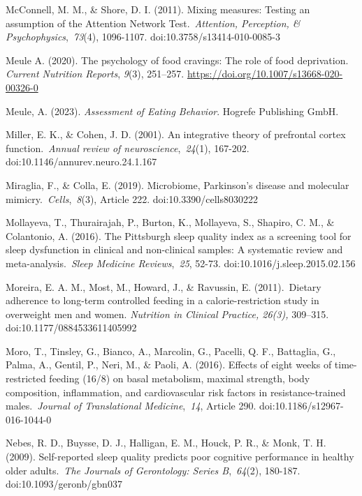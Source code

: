 \documentclass[authordate, empirical]{jote-new-article}
\begin{document}
McConnell, M. M., \& Shore, D. I. (2011). Mixing measures: Testing an assumption of the Attention Network Test. \emph{Attention, Perception, \& Psychophysics}, \emph{73}(4), 1096-1107. doi:10.3758/s13414-010-0085-3



Meule A. (2020). The psychology of food cravings: The role of food deprivation. \emph{Current Nutrition Reports}, \emph{9}(3), 251--257. \href{https://doi.org/10.1007/s13668-020-00326-0}{https://doi.org/10.1007/s13668-020-00326-0}



Meule, A. (2023). \emph{Assessment of Eating Behavior}. Hogrefe Publishing GmbH.



Miller, E. K., \& Cohen, J. D. (2001). An integrative theory of prefrontal cortex function. \emph{Annual review of neuroscience}, \emph{24}(1), 167-202. doi:10.1146/annurev.neuro.24.1.167



Miraglia, F., \& Colla, E. (2019). Microbiome, Parkinson's disease and molecular mimicry. \emph{Cells}, \emph{8}(3), Article 222. doi:10.3390/cells8030222



Mollayeva, T., Thurairajah, P., Burton, K., Mollayeva, S., Shapiro, C. M., \& Colantonio, A. (2016). The Pittsburgh sleep quality index as a screening tool for sleep dysfunction in clinical and non-clinical samples: A systematic review and meta-analysis. \emph{Sleep Medicine Reviews}, \emph{25}, 52-73. doi:10.1016/j.sleep.2015.02.156



Moreira, E. A. M., Most, M., Howard, J., \& Ravussin, E. (2011). Dietary adherence to long-term controlled feeding in a calorie-restriction study in overweight men and women.\emph{ Nutrition in Clinical Practice, 26(3), }309--315.\emph{ }doi:10.1177/0884533611405992



Moro, T., Tinsley, G., Bianco, A., Marcolin, G., Pacelli, Q. F., Battaglia, G., Palma, A., Gentil, P., Neri, M., \& Paoli, A. (2016). Effects of eight weeks of time-restricted feeding (16/8) on basal metabolism, maximal strength, body composition, inflammation, and cardiovascular risk factors in resistance-trained males. \emph{Journal of Translational Medicine}, \emph{14}, Article 290. doi:10.1186/s12967-016-1044-0



Nebes, R. D., Buysse, D. J., Halligan, E. M., Houck, P. R., \& Monk, T. H. (2009). Self-reported sleep quality predicts poor cognitive performance in healthy older adults. \emph{The Journals of Gerontology: Series B}, \emph{64}(2), 180-187. doi:10.1093/geronb/gbn037
\end{document}
